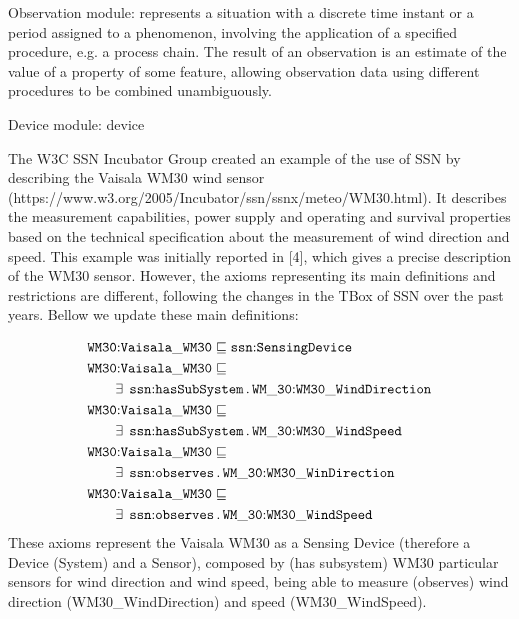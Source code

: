 \documentclass{sig-alternate-05-2015}
\newcommand{\erestr}[2]{\exists\;\,{\tt #1}\,.\,{\tt #2}}
\begin{document}
Observation module: represents a situation with a discrete time instant or a period assigned to a phenomenon, involving the application of a specified procedure, e.g. a process chain. The result of an observation is an estimate of the value of a property of some feature, allowing observation data using different procedures to be combined unambiguously. 

Device module: device

The W3C SSN Incubator Group created an example of the use of SSN by describing the Vaisala WM30 wind sensor (https://www.w3.org/2005/Incubator/ssn/ssnx/meteo/WM30.html). It describes the measurement capabilities, power supply and operating and survival properties based on the technical specification about the measurement of wind direction and speed. This example was initially reported in [4], which gives a precise description of the WM30 sensor. However, the axioms representing its main definitions and restrictions are different, following the changes in the TBox of SSN over the past years. Bellow we update these main definitions:

\begin{align*}
  \begin{aligned}
	&\node{WM30}{Vaisala\_WM30} \sqsubseteq \node{ssn}{SensingDevice}\\
	&\node{WM30}{Vaisala\_WM30} \sqsubseteq\\
	&\qquad\erestr{\node{ssn}{hasSubSystem}}{\node{WM\_30}{WM30\_WindDirection}}\\
	&\node{WM30}{Vaisala\_WM30} \sqsubseteq\\
	&\qquad\erestr{\node{ssn}{hasSubSystem}}{\node{WM\_30}{WM30\_WindSpeed}}\\	
	&\node{WM30}{Vaisala\_WM30} \sqsubseteq\\
	&\qquad\erestr{\node{ssn}{observes}}{\node{WM\_30}{WM30\_WinDirection}}\\
	&\node{WM30}{Vaisala\_WM30} \sqsubseteq\\
	&\qquad\erestr{\node{ssn}{observes}}{\node{WM\_30}{WM30\_WindSpeed}}\\
  \end{aligned}\\
\end{align*}
These axioms represent the Vaisala WM30 as a Sensing Device (therefore a Device (System) and a Sensor), composed by (has subsystem) WM30 particular sensors for wind direction and wind speed, being able to measure (observes) wind direction (WM30\_WindDirection) and speed (WM30\_WindSpeed). 
\end{document}
